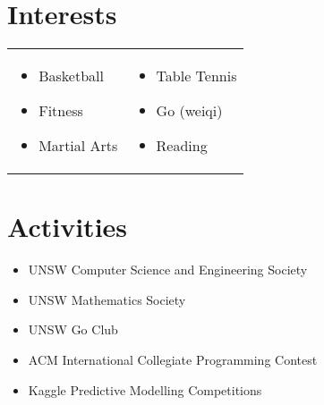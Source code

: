 \documentclass[a4paper,10pt]{article} %
\begin{document}

\section{Interests}


\begin{tabular}{p{}p{}}

\begin{itemize}
\item Basketball
\item Fitness
\item Martial Arts
\end{itemize} &

\begin{itemize}
\item Table Tennis
\item Go (weiqi)
\item Reading
\end{itemize} \\

\end{tabular}

\section{Activities}

\begin{itemize}
\item UNSW Computer Science and Engineering Society
\item UNSW Mathematics Society
\item UNSW Go Club
\item ACM International Collegiate Programming Contest
\item Kaggle Predictive Modelling Competitions
\end{itemize}

\end{document}
